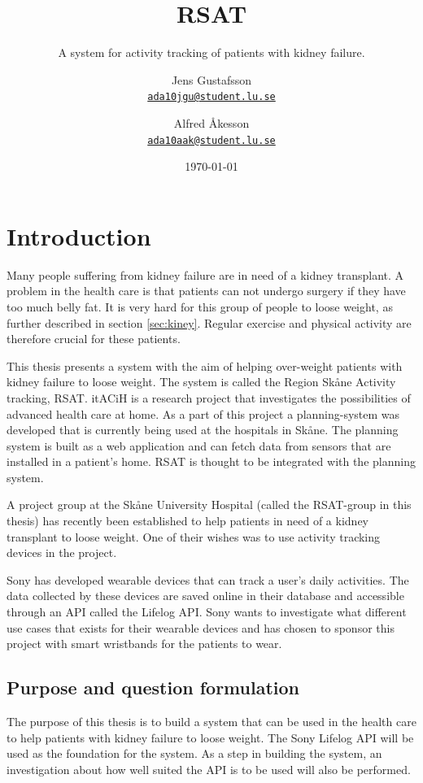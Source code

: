 \documentclass{cslthse-msc}
\author{
	Jens Gustafsson \\
	{\normalsize \href{mailto:ada10jgu@student.lu.se}{\texttt{ada10jgu@student.lu.se}}}
	\and
	Alfred Åkesson \\
    {\normalsize \href{mailto:ada10aak@student.lu.se}{\texttt{ada10aak@student.lu.se}}}
}
\title{RSAT}
\subtitle{A system for activity tracking of patients with kidney failure.}
\date{\today}
\begin{document}
\makefrontmatter


\chapter[Introduction]{Introduction}

Many people suffering from kidney failure are in need of a kidney transplant. A problem in the health care is that patients can not undergo surgery if they have too much belly fat. It is very hard for this group of people to loose weight, as further described in section \ref{sec:kiney}. Regular exercise and physical activity are therefore crucial for these patients. 

This thesis presents a system with the aim of helping over-weight patients with kidney failure to loose weight. The system is called the Region Skåne Activity tracking, RSAT. itACiH is a research project that investigates the possibilities of advanced health care at home. As a part of this project a planning-system was developed that is currently being used at the hospitals in Skåne. The planning system is built as a web application and can fetch data from sensors that are installed in a patient's home. RSAT is thought to be integrated with the planning system. 

A project group at the Skåne University Hospital (called the RSAT-group in this thesis) has recently been established to help patients in need of a kidney transplant to loose weight. One of their wishes was to use activity tracking devices in the project. 

Sony has developed wearable devices that can track a user’s daily activities. The data collected by these devices are saved online in their database and accessible through an API called the Lifelog API. Sony wants to investigate what different use cases that exists for their wearable devices and has chosen to sponsor this project with smart wristbands for the patients to wear.





\newpage

\section{Purpose and question formulation}

The purpose of this thesis is to build a system that can be used in the health care to help patients with kidney failure to loose weight. The Sony Lifelog API will be used as the foundation for the system. As a step in building the system, an investigation about how well suited the API is to be used will also be performed. 
\end{document}
